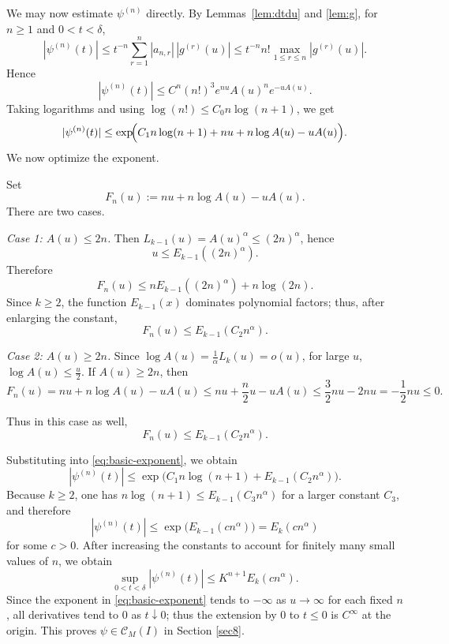 \documentclass[11pt]{amsart}
\newcommand{\1}{{\rm 1\hspace*{-0.4ex}%
			\rule{0.1ex}{1.52ex}\hspace*{0.2ex}}}
\numberwithin{equation}{section}
\begin{document}
We may now estimate $\psi^{(n)}$ directly.
By Lemmas~\ref{lem:dtdu} and \ref{lem:g}, for $n\ge 1$ and $0<t<\delta$,
\[
|\psi^{(n)}(t)|
\le t^{-n}\sum_{r=1}^n |a_{n,r}|\,|g^{(r)}(u)|
\le t^{-n}n!\max_{1\le r\le n}|g^{(r)}(u)|.
\]
Hence
\[
|\psi^{(n)}(t)|
\le C^n (n!)^3 e^{nu}A(u)^n e^{-uA(u)}.
\]
Taking logarithms and using $\log(n!)\le C_0n\log(n+1)$, we get
\begin{equation}
	\label{eq:basic-exponent}
	|\psi^{(n)}(t)|
	\le \exp\!\Bigl(C_1n\log(n+1)+nu+n\log A(u)-uA(u)\Bigr).
\end{equation}
We now optimize the exponent.

Set
\[
F_n(u):=nu+n\log A(u)-uA(u).
\]
There are two cases.

\smallskip
\emph{Case 1: $A(u)\le 2n$.}
Then $L_{k-1}(u)=A(u)^\alpha\le (2n)^\alpha$, hence
\[
u\le E_{k-1}((2n)^\alpha).
\]
Therefore
\[
F_n(u)\le nE_{k-1}((2n)^\alpha)+n\log(2n).
\]
Since $k\ge 2$, the function $E_{k-1}(x)$ dominates polynomial factors; thus, after enlarging the constant,
\[
F_n(u)\le E_{k-1}(C_2n^\alpha).
\]

\smallskip
\emph{Case 2: $A(u)\ge 2n$.}
Since $\log A(u)=\frac1\alpha L_k(u)=o(u)$, for large $u$,
$\log A(u)\le \frac{u}{2}$. If $A(u)\ge 2n$, then
\[
F_n(u)
=nu+n\log A(u)-uA(u)
\le nu+\frac{n}{2}u-uA(u)
\le \frac32 nu-2nu
= -\frac12 nu\le 0.
\]

Thus in this case as well,
\[
F_n(u)\le E_{k-1}(C_2n^\alpha).
\]

Substituting into \eqref{eq:basic-exponent}, we obtain
\[
|\psi^{(n)}(t)|\le \exp\!\bigl(C_1n\log(n+1)+E_{k-1}(C_2n^\alpha)\bigr).
\]
Because $k\ge 2$, one has $n\log(n+1)\le E_{k-1}(C_3n^\alpha)$ for a larger constant $C_3$, and therefore
\[
|\psi^{(n)}(t)|\le \exp\!\bigl(E_{k-1}(cn^\alpha)\bigr)=E_k(cn^\alpha)
\]
for some $c>0$.
After increasing the constants to account for finitely many small values of $n$, we obtain
\[
\sup_{0<t<\delta}|\psi^{(n)}(t)|\le K^{n+1}E_k(cn^\alpha).
\]
Since the exponent in \eqref{eq:basic-exponent} tends to $-\infty$ as $u\to\infty$ for each fixed $n$, all derivatives tend to $0$ as $t\downarrow 0$; thus the extension by $0$ to $t\le 0$ is $C^\infty$ at the origin. This proves $\psi\in \mathcal{C}_M(I)$ in Section \ref{sec8}.
\end{document}
